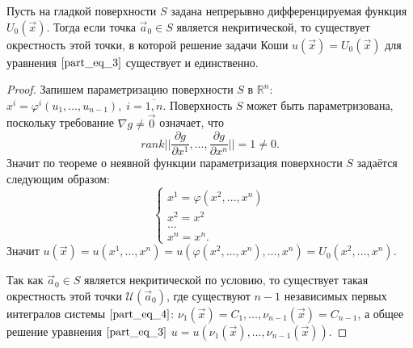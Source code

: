 \begin{theorem}
	Пусть на гладкой поверхности $S$ задана непрерывно дифференцируемая функция $U_0 \left( \vec{x} \right)$. Тогда если точка $\vec{a}_0 \in S$ является некритической, то существует окрестность этой точки, в которой решение задачи Коши $u \left( \vec{x} \right) = U_0 \left( \vec{x} \right)$ для уравнения $\eqref{part_eq_3}$ существует и единственно.
\end{theorem}
\begin{proof}
	Запишем параметризацию поверхности $S$ в $\mathbb{R}^n$: $x^i = \varphi^i \left( u_1, \dots, u_{n - 1} \right), \; i = \overline{1, n}$. Поверхность $S$ может быть параметризована, поскольку требование $\nabla g \neq \vec{0}$ означает, что 
	\begin{equation*}
		rank \bigg| \bigg| \frac{\partial g}{\partial x^{1}}, \dots, \frac{\partial g}{\partial x^{n}} \bigg| \bigg| = 1 \neq 0.
	\end{equation*}
	Значит по теореме о неявной функции параметризация поверхности $S$ задаётся следующим образом:
	\begin{equation*}
		\begin{cases}
			x^1 = \varphi \left( x^2, \dots, x^n \right) \\
			x^2 = x^2                                    \\
			\dots                                        \\
			x^n = x^n.
		\end{cases}
	\end{equation*}
	Значит $u \left( \vec{x} \right) = u \left( x^1, \dots, x^n \right) = u \left( \varphi \left( x^2, \dots, x^n \right), \dots, x^n \right) = U_0 \left( x^2, \dots, x^n \right)$.
	
	Так как $\vec{a}_0 \in S$ является некритической по условию, то существует такая окрестность этой точки $\mathcal{U}  \left( \vec{a}_0 \right)$, где существуют $n - 1$ независимых первых интегралов системы $\eqref{part_eq_4}$: $\nu_1 \left( \vec{x} \right) = C_1, \dots, \nu_{n - 1} \left( \vec{x} \right) = C_{n - 1}$, а общее решение уравнения $\eqref{part_eq_3}$ $u = u \left( \nu_1 \left( \vec{x} \right), \dots, \nu_{n - 1} \left( \vec{x} \right) \right)$. 


\end{proof}
